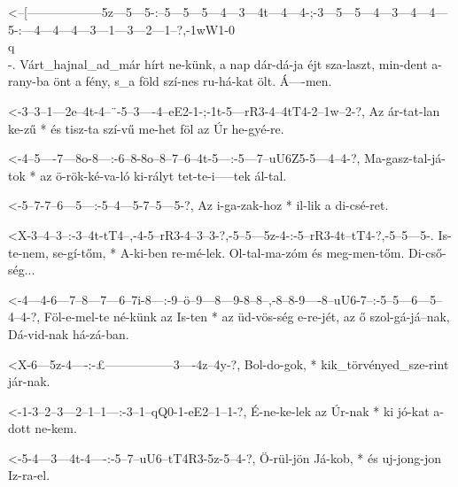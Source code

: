 
  {<--[------------------5z---5---5-:--5---5---5---4---3---4t---4---4-;-3---5---5---4---3---4---4---5-:---4---4---4---3---1---3---2---1--?,-1wW1-0\\q\\-.}
  {   Várt_hajnal_ad_már hírt ne-künk, a nap dár-dá-ja éjt sza-laszt, min-dent a-rany-ba önt a fény, s_a föld szí-nes ru-há-kat ölt.        Á----men.}

  {<-3--3--1---2e--4t-4--¨-5--3----4--eE2-1-;-1t-5---rR3-4--4tT4-2--1w--2-?,}
  {  Az ár-tat-lan ke-zű * és tisz-ta szí-vű  me-het föl az Úr   he-gyé-re.}

  {<-4--5----7---8o-8---:-6--8-8o--8--7--6--4t-5---:-5---7--uU6Z5-5---4--4-?,}
  {  Ma-gasz-tal-já-tok * az ö-rök-ké-va-ló ki-rályt tet-te-i-----tek ál-tal.}

  {<-5--7-7--6---5---:-5--4---5-7--5---5-?,}
  {  Az i-ga-zak-hoz * il-lik a di-csé-ret.}

  {<X-3--4--3--:-3--4t-tT4--,-4-5--rR3-4--3--3-?,-5--5---5z-4-:-5--rR3-4t--tT4-?,-5--5---5-.}
  {   Is-te-nem, se-gí-tőm, * A-ki-ben re-mé-lek. Ol-tal-ma-zóm és meg-men-tőm.   Di-cső-ség...}

  {<-4---4-6---7--8---7---6--7i-8---:-9--ö--9---8---9-8--8--,-8--8-9----8--uU6-7--:-5--5---6---5--4--4-?,}
  {  Föl-e-mel-te né-künk az Is-ten * az üd-vös-ség e-re-jét, az ő szol-gá-já--nak, Dá-vid-nak há-zá-ban.}


  {<X-6---5z-4----:-£-----------------3----4z--4y-?,}
  {   Bol-do-gok, * kik_törvényed_sze-rint jár-nak.}

  {<-1-3--2--3---2--1--1---:-3--1--qQ0-1-eE2--1--1-?,}
  {  É-ne-ke-lek az Úr-nak * ki jó-kat a-dott ne-kem.}

  {<-5-4---3---4t-4----:-5--7--uU6--tT4R3-5z-5--4-?,}
  {  Ö-rül-jön Já-kob, * és uj-jong-jon   Iz-ra-el.}

